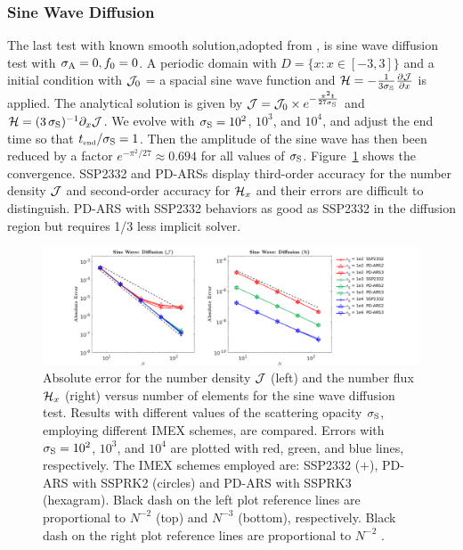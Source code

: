 \subsubsection{Sine Wave Diffusion}
The last test with known smooth solution,adopted from \cite{radice_etal_2013}, is sine wave diffusion test with $\sigma_{{\rm A}} = 0, f_0 = 0$.
A periodic domain with $D=\{x:x\in[-3,3]\}$ and a initial condition with $\mathcal{J}_{0}$ = a spacial sine wave function and $\mathcal{H} =-\frac{1}{3\sigma_{{\rm S}}}\frac{\partial \mathcal{J}}{\partial x}$ is applied.
The analytical solution is given by $\mathcal{J} = \mathcal{J}_{0} \times e^{-\frac{\pi^2 t}{27\sigma_{{\rm S}}}}$ and $\mathcal{H} = (3\,\sigma_{{\rm S}})^{-1}\partial_{x}{\mathcal{J}}$.
We evolve with $\sigma_{{\rm S}}=10^{2}$, $10^{3}$, and $10^{4}$, and adjust the end time so that $t_{\mbox{\tiny end}}/\sigma_{{\rm S}}=1$. 
Then the amplitude of the sine wave has then been reduced by a factor $e^{-\pi^{2}/27}\approx0.694$ for all values of $\sigma_{{\rm S}}$. 
Figure~\ref{fig:SineWaveDiffusionJ} shows the convergence.
SSP2332 and PD-ARSs display third-order accuracy for the number density $\mathcal{J}$ and second-order accuracy for $\mathcal{H}_{x}$ and their errors are difficult to distinguish.
PD-ARS with SSP2332 behaviors as good as SSP2332 in the diffusion region but requires 1/3 less implicit solver.
\begin{figure}[h]
  \centering
  \centerline{\includegraphics[width=1.2\textwidth]{figures/SineWaveDiffusion}}
   \caption{Absolute error for the number density $\mathcal{J}$ (left) and the number flux $\mathcal{H}_{x}$ (right) versus number of elements for the sine wave diffusion test.  Results with different values of the scattering opacity $\sigma_{{\rm S}}$, employing different IMEX schemes, are compared.  Errors with $\sigma_{{\rm S}}=10^{2}$, $10^{3}$, and $10^{4}$ are plotted with red, green, and blue lines, respectively.  The IMEX schemes employed are:  SSP2332 ($+$), PD-ARS with SSPRK2 (circles) and PD-ARS with SSPRK3 (hexagram). Black dash on the left plot reference lines are proportional to $N^{-2}$ (top) and $N^{-3}$ (bottom), respectively. Black dash on the right plot reference lines are proportional to $N^{-2}$ .}
   \label{fig:SineWaveDiffusionJ}
\end{figure}

